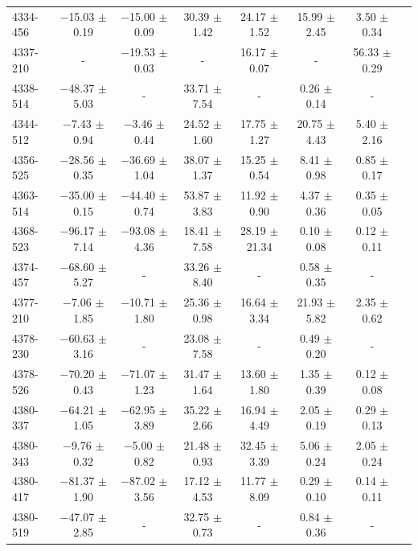\documentclass[a4paper,fleqn,usenatbib]{mnras}     %
\begin{document}
\begin{longtable}{l c c c c c c c }
4334-456   &   $-$15.03 $\pm$ 0.19   &   $-$15.00 $\pm$ 0.09   &    30.39 $\pm$ 1.42   &  24.17 $\pm$ 1.52   &  15.99 $\pm$ 2.45   &   3.50 $\pm$ 0.34  \\
4337-210   &     -   &   $-$19.53 $\pm$ 0.03   &     -   &  16.17 $\pm$ 0.07   &   -   &  56.33 $\pm$ 0.29  \\
4338-514   &   $-$48.37 $\pm$ 5.03   &     -   &    33.71 $\pm$ 7.54   &   -   &   0.26 $\pm$ 0.14   &   -  \\
4344-512   &    $-$7.43 $\pm$ 0.94   &    $-$3.46 $\pm$ 0.44   &    24.52 $\pm$ 1.60   &  17.75 $\pm$ 1.27   &  20.75 $\pm$ 4.43   &   5.40 $\pm$ 2.16  \\
4356-525   &   $-$28.56 $\pm$ 0.35   &   $-$36.69 $\pm$ 1.04   &    38.07 $\pm$ 1.37   &  15.25 $\pm$ 0.54   &   8.41 $\pm$ 0.98   &   0.85 $\pm$ 0.17  \\
4363-514   &   $-$35.00 $\pm$ 0.15   &   $-$44.40 $\pm$ 0.74   &    53.87 $\pm$ 3.83   &  11.92 $\pm$ 0.90   &   4.37 $\pm$ 0.36   &   0.35 $\pm$ 0.05  \\
4368-523   &   $-$96.17 $\pm$ 7.14   &   $-$93.08 $\pm$ 4.36   &    18.41 $\pm$ 7.58   &  28.19 $\pm$21.34   &   0.10 $\pm$ 0.08   &   0.12 $\pm$ 0.11  \\
4374-457   &   $-$68.60 $\pm$ 5.27   &     -   &    33.26 $\pm$ 8.40   &   -   &   0.58 $\pm$ 0.35   &   -  \\
4377-210   &    $-$7.06 $\pm$ 1.85   &   $-$10.71 $\pm$ 1.80   &    25.36 $\pm$ 0.98   &  16.64 $\pm$ 3.34   &  21.93 $\pm$ 5.82   &   2.35 $\pm$ 0.62  \\
4378-230   &   $-$60.63 $\pm$ 3.16   &     -   &    23.08 $\pm$ 7.58   &   -   &   0.49 $\pm$ 0.20   &   -  \\
4378-526   &   $-$70.20 $\pm$ 0.43   &   $-$71.07 $\pm$ 1.23   &    31.47 $\pm$ 1.64   &  13.60 $\pm$ 1.80   &   1.35 $\pm$ 0.39   &   0.12 $\pm$ 0.08  \\
4380-337   &   $-$64.21 $\pm$ 1.05   &   $-$62.95 $\pm$ 3.89   &    35.22 $\pm$ 2.66   &  16.94 $\pm$ 4.49   &   2.05 $\pm$ 0.19   &   0.29 $\pm$ 0.13  \\
4380-343   &    $-$9.76 $\pm$ 0.32   &    $-$5.00 $\pm$ 0.82   &    21.48 $\pm$ 0.93   &  32.45 $\pm$ 3.39   &   5.06 $\pm$ 0.24   &   2.05 $\pm$ 0.24  \\
4380-417   &   $-$81.37 $\pm$ 1.90   &   $-$87.02 $\pm$ 3.56   &    17.12 $\pm$ 4.53   &  11.77 $\pm$ 8.09   &   0.29 $\pm$ 0.10   &   0.14 $\pm$ 0.11  \\
4380-519   &   $-$47.07 $\pm$ 2.85   &     -   &    32.75 $\pm$ 0.73   &   -   &   0.84 $\pm$ 0.36   &   -  \\

\end{longtable}
\end{document}
